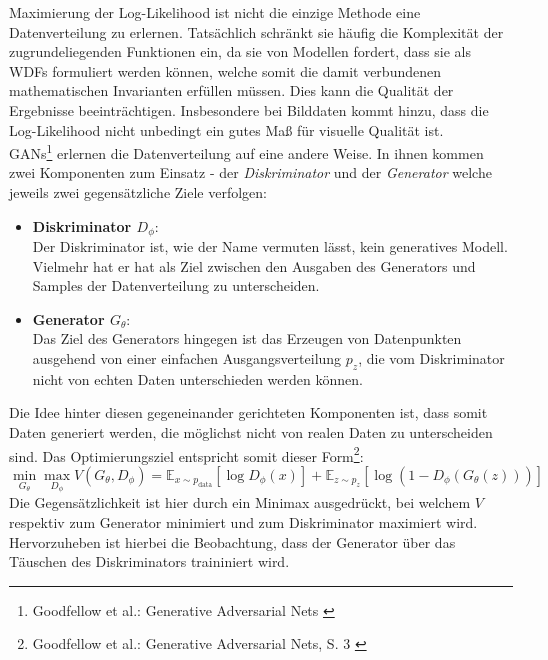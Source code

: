 Maximierung der Log-Likelihood ist nicht die einzige Methode eine Datenverteilung zu erlernen. Tatsächlich schränkt sie häufig die Komplexität der zugrundeliegenden Funktionen ein, da sie von Modellen fordert, dass sie als \ac{WDF}s formuliert werden können, welche somit die damit verbundenen mathematischen Invarianten erfüllen müssen. Dies kann die Qualität der Ergebnisse beeinträchtigen. Insbesondere bei Bilddaten kommt hinzu, dass die Log-Likelihood nicht unbedingt ein gutes Maß für visuelle Qualität ist.\\
\ac{GAN}s\footnote{
    Goodfellow et al.: Generative Adversarial Nets
    \cite{goodfellow2014generativeadversarialnetworks}
} erlernen die Datenverteilung auf eine andere Weise. In ihnen kommen zwei Komponenten zum Einsatz - der \textit{Diskriminator} und der \textit{Generator} welche jeweils zwei gegensätzliche Ziele verfolgen:
\begin{itemize}
    \item \textbf{Diskriminator $D_\phi$}: \\
    Der Diskriminator ist, wie der Name vermuten lässt, kein generatives Modell. Vielmehr hat er hat als Ziel zwischen den Ausgaben des Generators und Samples der Datenverteilung zu unterscheiden.
    \item \textbf{Generator $G_\theta$}: \\
    Das Ziel des Generators hingegen ist das Erzeugen von Datenpunkten ausgehend von einer einfachen Ausgangsverteilung $p_z$, die vom Diskriminator nicht von echten Daten unterschieden werden können. 
\end{itemize}
Die Idee hinter diesen gegeneinander gerichteten Komponenten ist, dass somit Daten generiert werden, die möglichst nicht von realen Daten zu unterscheiden sind. Das Optimierungsziel entspricht somit dieser Form\footnote{
    Goodfellow et al.: Generative Adversarial Nets, S. 3
    \cite{goodfellow2014generativeadversarialnetworks}
}:
\begin{equation}
    \min_{G_\theta}\max_{D_\phi}V(G_\theta, D_\phi)
    = \mathbb E_{x \sim p_\text{data}}[\log D_\phi(x)] 
    + \mathbb E_{z \sim p_z}[\log (1 - D_\phi(G_\theta(z)))]
\end{equation}
Die Gegensätzlichkeit ist hier durch ein Minimax ausgedrückt, bei welchem $V$ respektiv zum Generator minimiert und zum Diskriminator maximiert wird. Hervorzuheben ist hierbei die Beobachtung, dass der Generator über das Täuschen des Diskriminators traininiert wird. \\
